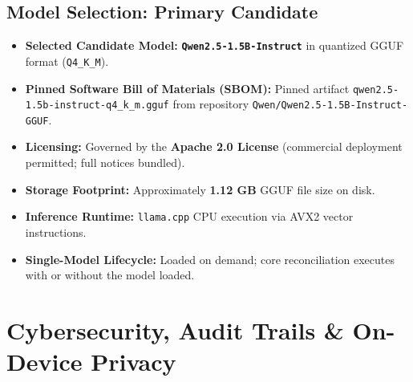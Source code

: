 \documentclass[11pt,a4paper]{article}
\newcommand{\code}[1]{\texttt{#1}}
\begin{document}
\subsection{Model Selection: Primary Candidate}
\begin{itemize}
    \item \textbf{Selected Candidate Model:} \textbf{\code{Qwen2.5-1.5B-Instruct}} in quantized GGUF format (\code{Q4\_K\_M}).
    \item \textbf{Pinned Software Bill of Materials (SBOM):} Pinned artifact \code{qwen2.5-1.5b-instruct-q4\_k\_m.gguf} from repository \code{Qwen/Qwen2.5-1.5B-Instruct-GGUF}.
    \item \textbf{Licensing:} Governed by the \textbf{Apache 2.0 License} (commercial deployment permitted; full notices bundled).
    \item \textbf{Storage Footprint:} Approximately \textbf{1.12 GB} GGUF file size on disk.
    \item \textbf{Inference Runtime:} \code{llama.cpp} CPU execution via AVX2 vector instructions.
    \item \textbf{Single-Model Lifecycle:} Loaded on demand; core reconciliation executes with or without the model loaded.
\end{itemize}

\vspace{0.2cm}

\section{Cybersecurity, Audit Trails \& On-Device Privacy}
\end{document}
